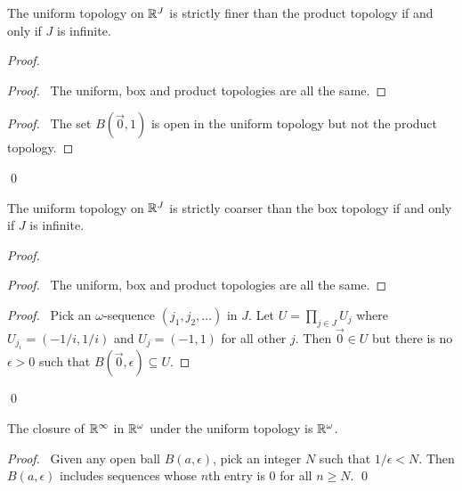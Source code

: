 \begin{proposition}
    The uniform topology on $\mathbb{R}^J$ is strictly finer than the product topology if and only if $J$ is infinite.
\end{proposition}

\begin{proof}
    \pf
    \begin{proof}
        \pf\ The uniform, box and product topologies are all the same.
    \end{proof}
    \begin{proof}
        \pf\ The set $B(\vec{0}, 1)$ is open in the uniform topology but not the product topology.
    \end{proof}
    \qed
\end{proof}

\begin{proposition}[DC]
    The uniform topology on $\mathbb{R}^J$ is strictly coarser than the box topology if and only if $J$ is infinite.
\end{proposition}

\begin{proof}
    \pf
    \begin{proof}
        \pf\ The uniform, box and product topologies are all the same.
    \end{proof}
    \begin{proof}
        \pf\ Pick an $\omega$-sequence $(j_1, j_2, \ldots)$ in $J$. Let $U = \prod_{j \in J} U_j$ where $U_{j_i} = (-1/i, 1/i)$ and $U_j = (-1,1)$ for all other $j$.
        Then $\vec{0} \in U$ but there is no $\epsilon > 0$ such that $B(\vec{0}, \epsilon) \subseteq U$.
    \end{proof}
    \qed
\end{proof}

\begin{proposition}
    The closure of $\mathbb{R}^\infty$ in $\mathbb{R}^\omega$ under the uniform topology is $\mathbb{R}^\omega$.
\end{proposition}

\begin{proof}
    \pf\ Given any open ball $B(a, \epsilon)$, pick an integer $N$ such that $1 / \epsilon < N$. Then $B(a, \epsilon)$ includes sequences whose $n$th entry is 0
    for all $n \geq N$. \qed
\end{proof}

